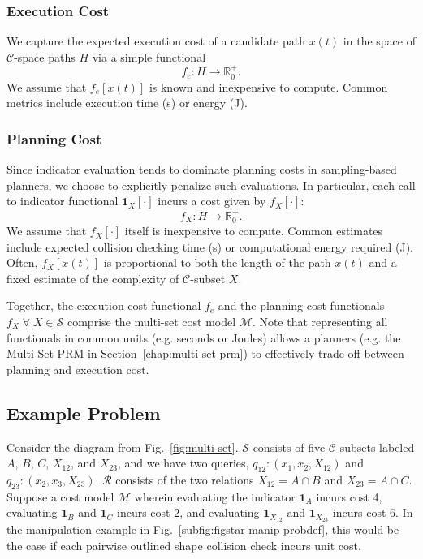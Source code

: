 \subsubsection{Execution Cost}
We capture the expected execution cost of a candidate path
$x(t)$ in the space of $\mathcal{C}$-space paths $H$
via a simple functional
\begin{equation}
  f_e : H \rightarrow \mathbb{R}_0^+ .
\end{equation}
We assume that $f_e[x(t)]$ is known and inexpensive to compute.
Common metrics include
execution time (s) or energy (J).

\subsubsection{Planning Cost}
Since indicator evaluation tends to dominate planning costs
in sampling-based planners,
we choose to explicitly penalize such evaluations.
In particular,
each call to indicator functional $\mathbf{1}_X[\cdot]$
incurs a cost given by $f_X[\cdot]$:
\begin{equation}
  f_X : H \rightarrow \mathbb{R}_0^+ .
\end{equation}
We assume that $f_X[\cdot]$ itself is inexpensive to compute.
Common estimates include expected collision checking time (s)
or computational energy required (J).
Often, $f_X[x(t)]$ is proportional to both
the length of the path $x(t)$
and a fixed estimate of the complexity of $\mathcal{C}$-subset $X$.

Together, the execution cost functional $f_e$
and the planning cost functionals $f_X \;\forall\; X \in \mathcal{S}$
comprise the multi-set cost model $\mathcal{M}$.
Note that representing all functionals in common units
(e.g. seconds or Joules) allows a planners
(e.g. the Multi-Set PRM in Section~\ref{chap:multi-set-prm})
to effectively trade off between planning and execution cost.

\subsection{Example Problem}
\label{subsec:multi-prm-example}

Consider the diagram from Fig.~\ref{fig:multi-set}.
$\mathcal{S}$ consists of five $\mathcal{C}$-subsets labeled
$A$, $B$, $C$, $X_{12}$, and $X_{23}$,
and we have two queries,
$q_{12}: (x_1, x_2, X_{12})$
and
$q_{23}: (x_2, x_3, X_{23})$.
$\mathcal{R}$ consists of the two relations
$X_{12} = A \cap B$ and $X_{23} = A \cap C$.
Suppose a cost model $\mathcal{M}$
wherein evaluating the indicator
$\mathbf{1}_A$ incurs cost 4,
evaluating $\mathbf{1}_B$ and $\mathbf{1}_C$ incurs cost 2,
and evaluating $\mathbf{1}_{X_{12}}$ and $\mathbf{1}_{X_{23}}$
incurs cost 6.
In the manipulation example in
Fig.~\ref{subfig:figstar-manip-probdef},
this would be the case if each
pairwise outlined shape collision check incurs unit cost.

